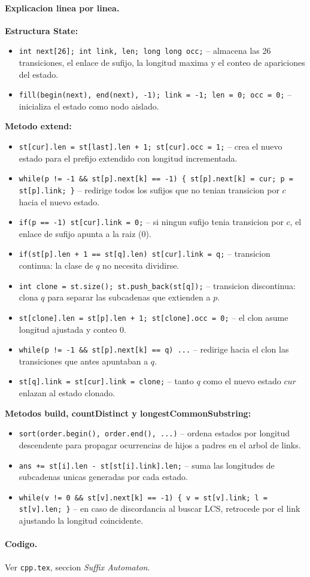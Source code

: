 \paragraph{Explicacion linea por linea.}
\textbf{Estructura State:}
\begin{itemize}\setlength\itemsep{0pt}
	\item \verb|int next[26]; int link, len; long long occ;| -- almacena las 26 transiciones, el enlace de sufijo, la longitud maxima y el conteo de apariciones del estado.
	\item \verb|fill(begin(next), end(next), -1); link = -1; len = 0; occ = 0;| -- inicializa el estado como nodo aislado.
\end{itemize}
\textbf{Metodo extend:}
\begin{itemize}\setlength\itemsep{0pt}
	\item \verb|st[cur].len = st[last].len + 1; st[cur].occ = 1;| -- crea el nuevo estado para el prefijo extendido con longitud incrementada.
	\item \verb|while(p != -1 && st[p].next[k] == -1) { st[p].next[k] = cur; p = st[p].link; }| -- redirige todos los sufijos que no tenian transicion por $c$ hacia el nuevo estado.
	\item \verb|if(p == -1) st[cur].link = 0;| -- si ningun sufijo tenia transicion por $c$, el enlace de sufijo apunta a la raiz (0).
	\item \verb|if(st[p].len + 1 == st[q].len) st[cur].link = q;| -- transicion continua: la clase de $q$ no necesita dividirse.
	\item \verb|int clone = st.size(); st.push_back(st[q]);| -- transicion discontinua: clona $q$ para separar las subcadenas que extienden a $p$.
	\item \verb|st[clone].len = st[p].len + 1; st[clone].occ = 0;| -- el clon asume longitud ajustada y conteo 0.
	\item \verb|while(p != -1 && st[p].next[k] == q) ...| -- redirige hacia el clon las transiciones que antes apuntaban a $q$.
	\item \verb|st[q].link = st[cur].link = clone;| -- tanto $q$ como el nuevo estado $cur$ enlazan al estado clonado.
\end{itemize}
\textbf{Metodos build, countDistinct y longestCommonSubstring:}
\begin{itemize}\setlength\itemsep{0pt}
	\item \verb|sort(order.begin(), order.end(), ...)| -- ordena estados por longitud descendente para propagar ocurrencias de hijos a padres en el arbol de links.
	\item \verb|ans += st[i].len - st[st[i].link].len;| -- suma las longitudes de subcadenas unicas generadas por cada estado.
	\item \verb|while(v != 0 && st[v].next[k] == -1) { v = st[v].link; l = st[v].len; }| -- en caso de discordancia al buscar LCS, retrocede por el link ajustando la longitud coincidente.
\end{itemize}

\paragraph{Codigo.}
Ver \texttt{cpp.tex}, seccion \textit{Suffix Automaton}.

\vspace{0.5em}
